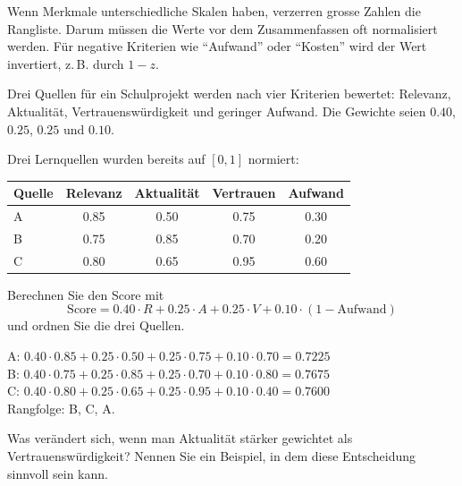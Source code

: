 \begin{mycaution}
    Wenn Merkmale unterschiedliche Skalen haben, verzerren grosse Zahlen die Rangliste.
    Darum müssen die Werte vor dem Zusammenfassen oft normalisiert werden.
    Für negative Kriterien wie \enquote{Aufwand} oder \enquote{Kosten} wird der Wert invertiert,
    z.\,B. durch $1-z$.
\end{mycaution}

\begin{myexample}
    Drei Quellen für ein Schulprojekt werden nach vier Kriterien bewertet:
    Relevanz, Aktualität, Vertrauenswürdigkeit und geringer Aufwand.
    Die Gewichte seien $0.40$, $0.25$, $0.25$ und $0.10$.
\end{myexample}

\begin{myexercise}
    Drei Lernquellen wurden bereits auf $[0,1]$ normiert:

    \begin{center}
        \begin{tabular}{lcccc}
            \toprule
            Quelle & Relevanz & Aktualität & Vertrauen & Aufwand \\
            \midrule
            A      & 0.85     & 0.50       & 0.75      & 0.30    \\
            B      & 0.75     & 0.85       & 0.70      & 0.20    \\
            C      & 0.80     & 0.65       & 0.95      & 0.60    \\
            \bottomrule
        \end{tabular}
    \end{center}

    Berechnen Sie den Score mit
    \[
        \text{Score} = 0.40\cdot R + 0.25\cdot A + 0.25\cdot V + 0.10\cdot(1-\text{Aufwand})
    \]
    und ordnen Sie die drei Quellen.
    \begin{myanswer}
        A: $0.40\cdot0.85 + 0.25\cdot0.50 + 0.25\cdot0.75 + 0.10\cdot0.70 = 0.7225$ \\
        B: $0.40\cdot0.75 + 0.25\cdot0.85 + 0.25\cdot0.70 + 0.10\cdot0.80 = 0.7675$ \\
        C: $0.40\cdot0.80 + 0.25\cdot0.65 + 0.25\cdot0.95 + 0.10\cdot0.40 = 0.7600$ \\
        Rangfolge: B, C, A.
    \end{myanswer}
\end{myexercise}

\begin{myexercise}
    Was verändert sich, wenn man Aktualität stärker gewichtet als Vertrauenswürdigkeit?
    Nennen Sie ein Beispiel, in dem diese Entscheidung sinnvoll sein kann.
\end{myexercise}

